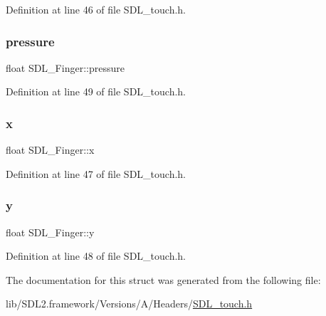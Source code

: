 Definition at line 46 of file S\+D\+L\+\_\+touch.\+h.

\mbox{\label{struct_s_d_l___finger_a0ecb50c7fd699d59899ac60c941bdee6}} 
\subsubsection{\texorpdfstring{pressure}{pressure}}
{\footnotesize\ttfamily float S\+D\+L\+\_\+\+Finger\+::pressure}



Definition at line 49 of file S\+D\+L\+\_\+touch.\+h.

\mbox{\label{struct_s_d_l___finger_ab91dfbd03c3215560457fef44e1c7755}} 
\subsubsection{\texorpdfstring{x}{x}}
{\footnotesize\ttfamily float S\+D\+L\+\_\+\+Finger\+::x}



Definition at line 47 of file S\+D\+L\+\_\+touch.\+h.

\mbox{\label{struct_s_d_l___finger_a0a2c7a06ae641940111e03801c672cf9}} 
\subsubsection{\texorpdfstring{y}{y}}
{\footnotesize\ttfamily float S\+D\+L\+\_\+\+Finger\+::y}



Definition at line 48 of file S\+D\+L\+\_\+touch.\+h.



The documentation for this struct was generated from the following file\+:\begin{DoxyCompactItemize}
\item 
lib/\+S\+D\+L2.\+framework/\+Versions/\+A/\+Headers/\mbox{\hyperlink{_s_d_l__touch_8h}{S\+D\+L\+\_\+touch.\+h}}\end{DoxyCompactItemize}
